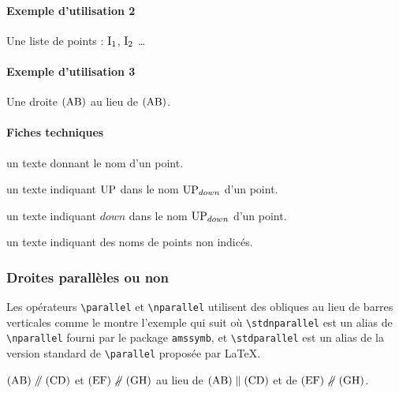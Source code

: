 \documentclass[12pt,a4paper]{article}
\theoremstyle{definition}
\begin{document}
\paragraph{Exemple d'utilisation 2}

\begin{tcblisting}{}
Une liste de points : $\pt*{I}{1}$, $\pt*{I}{2}$ \dots
\end{tcblisting}


\paragraph{Exemple d'utilisation 3}

\begin{tcblisting}{}
Une droite $(\pts{AB})$ au lieu de $(\pt{A}\pt{B})$.
\end{tcblisting}


\paragraph{Fiches techniques}


\IDarg{} un texte donnant le nom d'un point.


\bigskip



 un texte indiquant $\pt{UP}$ dans le nom $\pt*{UP}{down}$ d'un point.

 un texte indiquant $down$ dans le nom $\pt*{UP}{down}$ d'un point.


\bigskip



\IDarg{} un texte indiquant des noms de points non indicés.



\subsubsection{Droites parallèles ou non}

Les opérateurs \verb+\parallel+ et \verb+\nparallel+ utilisent des obliques au lieu de barres verticales comme le montre l'exemple qui suit où \verb+\stdnparallel+ est un alias de \verb+\nparallel+ fourni par le package \verb+amssymb+, et \verb+\stdparallel+ est un alias de la version standard de \verb+\parallel+ proposée par \LaTeX{}.

\begin{tcblisting}{}
$(\pts{AB}) \parallel (\pts{CD})$ et $(\pts{EF}) \nparallel (\pts{GH})$ au lieu de
$(\pts{AB}) \stdparallel (\pts{CD})$ et de $(\pts{EF}) \stdnparallel (\pts{GH})$.
\end{tcblisting}
\end{document}
